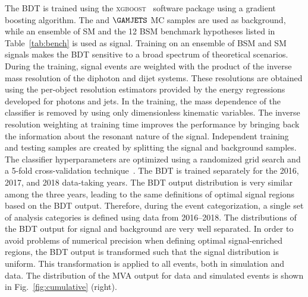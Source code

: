 \documentclass[11pt,a4paper,cmspaper,final,collab]{cms-tdr}
\begin{document}
The BDT is trained using the \textsc{xgboost}~\cite{xgboost} software package using a gradient boosting algorithm.
The \DIPHO and $\GAMJETS$ MC samples are used as background, while an ensemble of SM \HH and the 12 BSM \HH benchmark hypotheses listed in Table~\ref{tab:bench} is used as signal. Training on an ensemble of BSM and SM \HH signals makes the BDT sensitive to a broad spectrum of theoretical scenarios. During the training, signal
events are weighted with the product of the inverse mass resolution of the diphoton and dijet systems. These resolutions are obtained using the per-object
resolution estimators provided by the energy regressions developed for photons and {\cPqb} jets. 
In the training, the mass dependence of the classifier is removed by using only dimensionless kinematic variables.
The inverse resolution weighting at
training time improves the performance by bringing back the information about the resonant nature of the signal.
Independent training and testing samples are created
by splitting the signal and background samples. The classifier hyperparameters are optimized using a randomized grid search and a 5-fold cross-validation technique~\cite{Hastie}. The BDT is trained separately for the 2016, 2017, and 2018 data-taking years.
 The BDT output distribution is very similar among the three years, leading to the same definitions of optimal signal regions based on the BDT output. Therefore, during the event categorization, a single set of analysis categories is defined using data from 2016--2018.
The distributions of the BDT output for signal and background are very well separated. In order to avoid problems of numerical precision when defining optimal signal-enriched regions, the BDT output is transformed such that the signal distribution is uniform. This transformation is applied to all events, both in simulation
and data. The distribution of the MVA output for data and simulated events is shown in Fig.~\ref{fig:cumulative} (right). 
\end{document}
